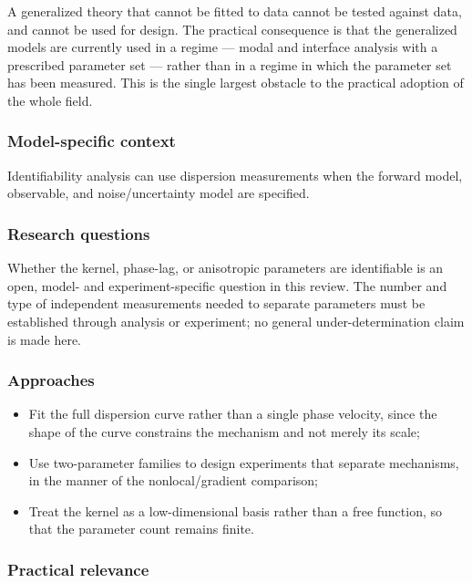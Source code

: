 A generalized theory that cannot be fitted to data cannot be tested against data, and cannot be used for design. The practical consequence is that the generalized models are currently used in a regime --- modal and interface analysis with a prescribed parameter set --- rather than in a regime in which the parameter set has been measured. This is the single largest obstacle to the practical adoption of the whole field.

\subsubsection{Model-specific context}

Identifiability analysis can use dispersion measurements when the forward model, observable, and noise/uncertainty model are specified.

\subsubsection{Research questions}

Whether the kernel, phase-lag, or anisotropic parameters are identifiable is an open, model- and experiment-specific question in this review. The number and type of independent measurements needed to separate parameters must be established through analysis or experiment; no general under-determination claim is made here.

\subsubsection{Approaches}

\begin{itemize}
\item Fit the full dispersion curve rather than a single phase velocity, since the shape of the curve constrains the mechanism and not merely its scale;
\item Use two-parameter families to design experiments that separate mechanisms, in the manner of the nonlocal/gradient comparison;
\item Treat the kernel as a low-dimensional basis rather than a free function, so that the parameter count remains finite.
\end{itemize}

\subsubsection{Practical relevance}


